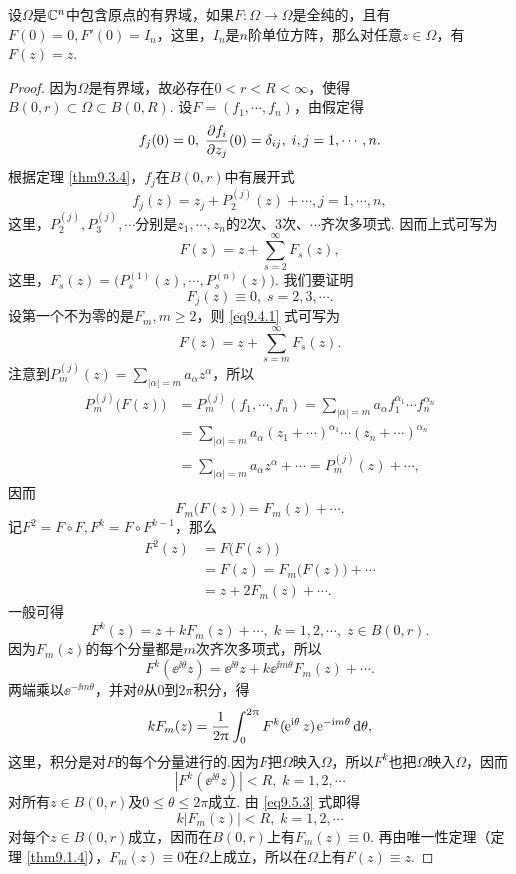 \begin{theorem}\label{thm9.5.1}
  设$\Omega$是$\mathbb C^n$中包含原点的有界域，如果$F:\Omega\to\Omega$是全纯的，且有$F(0)=0,F'(0)= I_n$，这里，$I_n$是$n$阶单位方阵，那么对任意$z\in\Omega$，有$F(z)=z$.
\end{theorem}
\begin{proof}
  因为$\Omega$是有界域，故必存在$0<r<R<\infty$，使得$B(0,r)\subset\Omega\subset B(0,R)$. 设$F=(f_1,\cdots,f_n)$，由假定得
  \[
    f_j(0) = 0,\;\frac{\partial f_i}{\partial z_j}(0) = \delta_{ij},\;i,j = 1,\cdots,n.
  \]
  根据定理 \ref{thm9.3.4}，$f_j$在$B(0,r)$中有展开式
  \[
    f_j(z) = z_j + P_2^{(j)}(z) + \cdots,j = 1,\cdots,n,
  \]
  这里，$P_2^{(j)},P_3^{(j)},\cdots$分别是$z_1,\cdots,z_n$的$2$次、$3$次、$\cdots$齐次多项式. 因而上式可写为
  \begin{equation}\label{eq9.5.1}
    F(z) = z + \sum_{s=2}^\infty F_s(z),
  \end{equation}
  这里，$F_s(z)=\big(P_s^{(1)}(z),\cdots,P_s^{(n)}(z)\big)$. 我们要证明
  \[
    F_j(z) \equiv 0,\;s = 2,3,\cdots.
  \]
  设第一个不为零的是$F_m,m\ge2$，则 \eqref{eq9.4.1} 式可写为
  \begin{equation}\label{eq9.5.2}
    F(z) = z + \sum_{s=m}^\infty F_s(z).
  \end{equation}
  注意到$P_m^{(j)}(z)=\sum_{|\alpha|=m}a_\alpha z^\alpha$，所以
  \begin{align*}
    P_m^{(j)}\big(F(z)\big) & = P_m^{(j)}(f_1,\cdots,f_n)=\sum_{|\alpha|=m}a_\alpha
    f_1^{\alpha_1}\cdots f_n^{\alpha_n}\\
    & = \sum_{|\alpha|=m}a_\alpha(z_1+\cdots)^{\alpha_1}\cdots(z_n+\cdots)^{\alpha_n}\\
    & = \sum_{|\alpha|=m}a_\alpha z^\alpha+\cdots=P_m^{(j)}(z)+\cdots,
  \end{align*}
  因而
  \[
    F_m \big( F(z) \big) = F_m(z) + \cdots.
  \]
  记$F^2=F\circ F,F^k=F\circ F^{k-1}$，那么
  \begin{align*}
    F^2(z) & = F\big(F(z)\big)\\
    & = F(z) = F_m\big(F(z)\big)+\cdots\\
    & =z +2F_m(z)+\cdots.
  \end{align*}
  一般可得
  \[
    F^k(z) = z + kF_m(z) + \cdots,\;k = 1,2,\cdots,\;z\in B(0,r).
  \]
  因为$F_m(z)$的每个分量都是$m$次齐次多项式，所以
  \[
    F^k(\ee^{\ii\theta}z) = \ee^{\ii\theta}z + k\ee^{\ii m\theta}F_m(z) + \cdots.
  \]
  两端乘以$\ee^{-\ii m\theta}$，并对$\theta$从$0$到$2\pi$积分，得
  \begin{equation}\label{eq9.5.3}
    kF_m(z) = \frac1{2\uppi}\int_0^{2\uppi}F^k(\operatorname{\!\!\;\mathrm e}^{\mathrm i\theta}z)\operatorname{\!\!\;\mathrm e}^{-\mathrm i m\theta}\mathop{}\!\mathrm{d} \theta,
  \end{equation}
  这里，积分是对$F$的每个分量进行的.因为$F$把$\Omega$映入$\Omega$，所以$F^k$也把$\Omega$映入$\Omega$，因而
  \[
    |F^k(\ee^{\ii\theta}z)| < R,\;k = 1,2,\cdots
  \]
  对所有$z\in B(0,r)$及$0\le\theta\le2\pi$成立. 由 \eqref{eq9.5.3} 式即得
  \[
    k|F_m(z)| < R,\;k=1,2,\cdots
  \]
  对每个$z\in B(0,r)$成立，因而在$B(0,r)$上有$F_m(z)\equiv0$. 再由唯一性定理（定理 \ref{thm9.1.4}），$F_m(z)\equiv0$在$\Omega$上成立，所以在$\Omega$上有$F(z)\equiv z$.
\end{proof}

